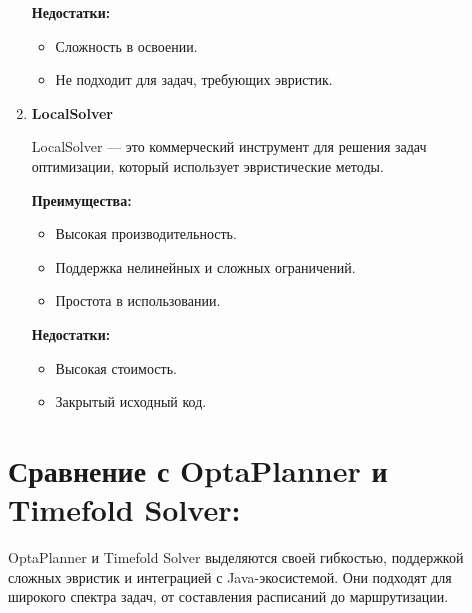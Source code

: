 \begin{enumerate}
\vspace{3mm}
\aim
\vspace{3mm}

\noindent \textbf{Недостатки:}
\begin{itemize}
\item Сложность в освоении.
\item Не подходит для задач, требующих эвристик.
\end{itemize}

\vspace{3mm}
\aim
\vspace{3mm}

\item \noindent \textbf {LocalSolver}

  LocalSolver — это коммерческий инструмент для решения задач оптимизации, который использует эвристические методы.
  
\vspace{3mm}
\aim
\vspace{3mm} 

\noindent \textbf{Преимущества:}
\begin{itemize}
    \item Высокая производительность.
    \item Поддержка нелинейных и сложных ограничений.
    \item Простота в использовании.
\end{itemize}

\vspace{3mm}
\aim
\vspace{3mm}

\noindent \textbf{Недостатки:}
\begin{itemize}
\item Высокая стоимость.
\item Закрытый исходный код.
\end{itemize}

\end{enumerate}

\section{ Сравнение с OptaPlanner и Timefold Solver:}

OptaPlanner и Timefold Solver выделяются своей гибкостью, поддержкой сложных эвристик и интеграцией с Java-экосистемой. Они подходят для широкого спектра задач, от составления расписаний до маршрутизации.
\vspace{3mm}
\aim
\vspace{3mm} 

